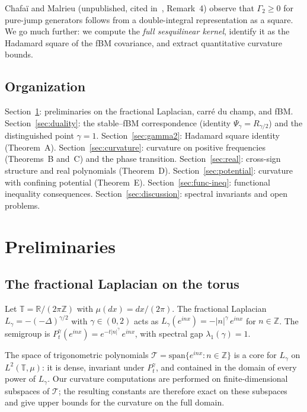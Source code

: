 \documentclass[11pt,a4paper]{article}
\theoremstyle{plain}
\theoremstyle{definition}
\theoremstyle{remark}
\newcommand{\R}{\mathbb{R}}
\newcommand{\Z}{\mathbb{Z}}
\newcommand{\T}{\mathbb{T}}
\begin{document}
Chafa\"i and Malrieu (unpublished, cited in~\cite{GentilImbert2008},
Remark~4) observe that $\Gamma_2 \geq 0$ for pure-jump generators
follows from a double-integral representation as a square. We go
much further: we compute the \emph{full sesquilinear kernel}, identify
it as the Hadamard square of the fBM covariance, and extract
quantitative curvature bounds.


\subsection{Organization}

Section~\ref{sec:prelim}: preliminaries on the fractional Laplacian,
carr\'e du champ, and fBM.
Section~\ref{sec:duality}: the stable--fBM correspondence (identity
$\Psi_\gamma = R_{\gamma/2}$) and the distinguished point $\gamma = 1$.
Section~\ref{sec:gamma2}: Hadamard square identity (Theorem~A).
Section~\ref{sec:curvature}: curvature on positive frequencies
(Theorems~B and~C) and the phase transition.
Section~\ref{sec:real}: cross-sign structure and real polynomials
(Theorem~D).
Section~\ref{sec:potential}: curvature with confining potential
(Theorem~E).
Section~\ref{sec:func-ineq}: functional inequality consequences.
Section~\ref{sec:discussion}: spectral invariants and open problems.


\section{Preliminaries}\label{sec:prelim}

\subsection{The fractional Laplacian on the torus}

Let $\T = \R/(2\pi\Z)$ with $\mu(dx) = dx/(2\pi)$. The fractional
Laplacian $L_\gamma = -(-\Delta)^{\gamma/2}$ with $\gamma \in (0,2)$
acts as $L_\gamma(e^{inx}) = -|n|^\gamma\,e^{inx}$ for $n \in \Z$.
The semigroup is $P_t^\gamma(e^{inx}) = e^{-t|n|^\gamma}\,e^{inx}$,
with spectral gap $\lambda_1(\gamma) = 1$.

The space of trigonometric polynomials
$\mathcal{T} = \mathrm{span}\{e^{inx} : n \in \Z\}$ is a core
for $L_\gamma$ on $L^2(\T,\mu)$: it is dense, invariant under $P_t^\gamma$,
and contained in the domain of every power of $L_\gamma$.
Our curvature computations are performed on finite-dimensional
subspaces of $\mathcal{T}$; the resulting constants are therefore
exact on these subspaces and give upper bounds for the curvature
on the full domain.
\end{document}
